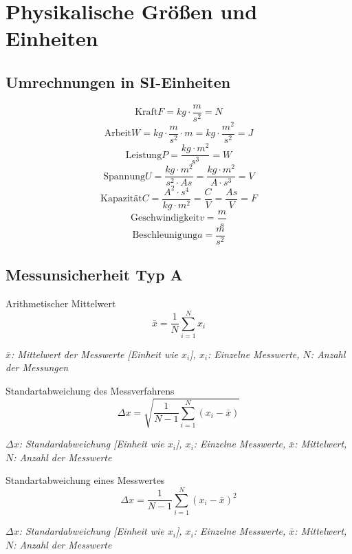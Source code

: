 \documentclass[a4paper,10pt]{article}
\newenvironment{displayformula}
{
	\begin{framed}
		\color{formulaColor}
	}
	{\end{framed}}
\newcommand{\formulalegend}[1]{%
	\par\vspace{0.5ex}%
	{{\color{legendColor}\RaggedRight\small\textit{#1}}}%
	\par\vspace{1.5ex}%
}
\begin{document}
	\tableofcontents
	
	
	\section{Physikalische Größen und Einheiten}
	
	\subsection{Umrechnungen in SI-Einheiten}
	

		\begin{displayformula}
		\[
		\text{Kraft} F = kg \cdot \frac{m}{s^2} = N
		\]
		\[
		\text{Arbeit} W = kg \cdot \frac{m}{s^2} \cdot m = kg \cdot \frac{m^2}{s^2} = J
		\]
		\[
		\text{Leistung} P = \frac{kg \cdot m^2}{s^3} = W
		\]
		\[
		\text{Spannung} U = \frac{kg \cdot m^2}{s^2 \cdot As} = \frac{kg \cdot m^2}{A \cdot s^3} = V
		\]
		\[
		\text{Kapazität} C = \frac{A^2 \cdot s^4}{kg \cdot m^2} = \frac{C}{V} = \frac{As}{V} = F
		\]
		\[
		\text{Geschwindigkeit} v = \frac{m}{s}
		\]
		\[
		\text{Beschleunigung} a = \frac{m}{s^2}
		\]
		\end{displayformula}

	
	
	\subsection{Messunsicherheit Typ A}
	
	\begin{displayformula}
		Arithmetischer Mittelwert
		\[
		\bar{x} = \frac{1}{N} \sum_{i=1}^{N} x_i
		\]
	\end{displayformula}
	\formulalegend{
		\( \bar{x} \): Mittelwert der Messwerte [Einheit wie \( x_i \)], \( x_i \): Einzelne Messwerte, \( N \): Anzahl der Messungen
	}
	
	\begin{displayformula}
		Standartabweichung des Messverfahrens
		\[
		\Delta x = \sqrt{\frac{1}{N - 1} \sum_{i = 1}^{N} (x_i - \bar{x})}
		\]
	\end{displayformula}
		\formulalegend{
		\( \Delta x \): Standardabweichung [Einheit wie \( x_i \)], \( x_i \): Einzelne Messwerte, \( \bar{x} \): Mittelwert, \( N \): Anzahl der Messwerte
	}
	
	\begin{displayformula}
		Standartabweichung eines Messwertes
		\[
		\Delta x = \frac{1}{N - 1} \sum_{i = 1}^{N} (x_i - \bar{x})^2
		\]	
	\end{displayformula}
	\formulalegend{
		\( \Delta x \): Standardabweichung [Einheit wie \( x_i \)], \( x_i \): Einzelne Messwerte, \( \bar{x} \): Mittelwert, \( N \): Anzahl der Messwerte
	}
	
\end{document}

